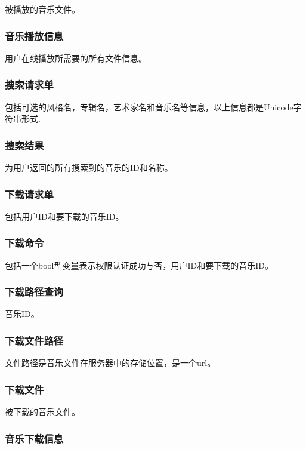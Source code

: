 被播放的音乐文件。

\subsubsection{音乐播放信息}

用户在线播放所需要的所有文件信息。

\subsubsection{搜索请求单}

包括可选的风格名，专辑名，艺术家名和音乐名等信息，以上信息都是Unicode字符串形式.

\subsubsection{搜索结果}

为用户返回的所有搜索到的音乐的ID和名称。


\subsubsection{下载请求单}

包括用户ID和要下载的音乐ID。

\subsubsection{下载命令}

包括一个bool型变量表示权限认证成功与否，用户ID和要下载的音乐ID。

\subsubsection{下载路径查询}

音乐ID。

\subsubsection{下载文件路径}

文件路径是音乐文件在服务器中的存储位置，是一个url。

\subsubsection{下载文件}

被下载的音乐文件。

\subsubsection{音乐下载信息}

